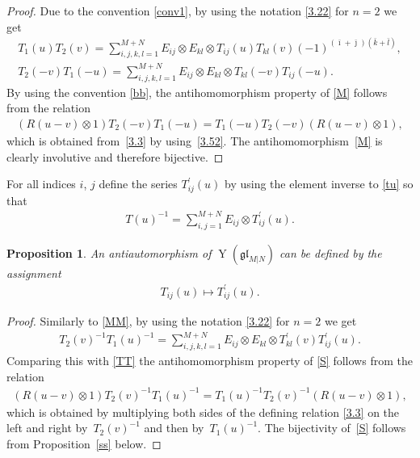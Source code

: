 \documentclass[10pt,a4paper]{amsart}
\numberwithin{equation}{section}
\newtheorem{Proposition}[Theorem]{Proposition}
\def\bi{{\bar\imath }}
\def\bj{{\bar\jmath }}
\def\bk{{\bar k }}
\def\bl{{\bar l }}
\def\glMN{\mathfrak{gl}_{M|N}}
\def\ot{\otimes}
\def\TP{T^{\prime}}
\def\YMN{\operatorname{Y}(\glMN)}
\begin{document}
\begin{proof}Due to the convention \eqref{conv1}, by using
the notation \eqref{3.22} for $n=2$ we get
\begin{gather}\label{TT}
T_1(u) T_2(v)=\sum_{i,j,k,l=1}^{M+N}
E_{ij}\ot E_{kl}\ot T_{ij}(u) T_{kl}(v)
{(-1)}^{( \bi+ \bj )( \bk+ \bl )} ,\\
\label{MM}
T_2(-v) T_1(-u)=\sum_{i,j,k,l=1}^{M+N}
E_{ij}\ot E_{kl}\ot T_{kl}(-v) T_{ij}(-u) .
\end{gather}
By using the convention \eqref{bb}, the antihomomorphism property of \eqref{M} follows from the relation
\begin{gather*}
(R (u-v)\ot1) T_2(-v) T_1(-u)=
T_1(-u) T_2(-v) (R (u-v)\ot1),
\end{gather*}
which is obtained from~\eqref{3.3} by using~\eqref{3.52}.
The antihomomorphism~\eqref{M} is clearly involutive and therefore bijective.
\end{proof}

For all indices $i$, $j$ define the series $\TP_{ij}(u)$
by using the element inverse to \eqref{tu} so that
\begin{gather}\label{tunat}
T(u)^{-1}=\sum_{i,j=1}^{M+N} E_{ij}\ot\TP_{ij}(u) .
\end{gather}

\begin{Proposition}\label{s}
An antiautomorphism of $\YMN$ can be defined by the assignment
\begin{gather}\label{S}
T_{ij}(u)\mapsto\TP_{ij}(u) .
\end{gather}
\end{Proposition}

\begin{proof}Similarly to \eqref{MM}, by using
the notation \eqref{3.22} for $n=2$ we get
\begin{gather*}
T_2(v)^{-1} T_1(u)^{-1}=\sum_{i,j,k,l=1}^{M+N}E_{ij}\ot E_{kl}\ot\TP_{kl}(v) \TP_{ij}(u) .
\end{gather*}
Comparing this with \eqref{TT} the antihomomorphism property of \eqref{S} follows from the relation
\begin{gather}\label{3.33}
(R (u-v)\ot1) T_2(v)^{-1} T_1(u)^{-1}=
T_1(u)^{-1} T_2(v)^{-1} (R (u-v)\ot1),
\end{gather}
which is obtained by multiplying both sides of the defining relation \eqref{3.3}
on the left and right by~$T_2(v)^{-1}$ and then by~$T_1(u)^{-1}$.
The bijectivity of~\eqref{S} follows from Proposition~\ref{ss} below.
\end{proof}
\end{document}
